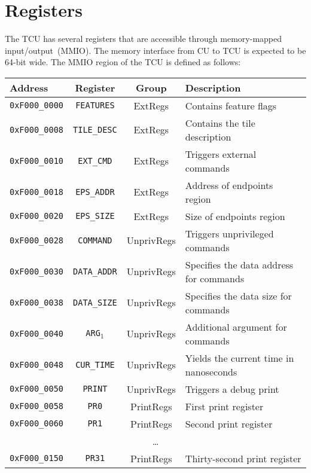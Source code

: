\section{Registers}

The TCU has several registers that are accessible through memory-mapped input/output~(MMIO). The
memory interface from CU to TCU is expected to be 64-bit wide. The MMIO region of the TCU is defined
as follows:

\vspace{2ex}
\noindent
\begin{tabular}{ p{3cm} | c | c | l }
  \textbf{Address} & \textbf{Register} & \textbf{Group} & \textbf{Description} \\
  \hline
  \hline
  \texttt{0xF000\_0000} & \texttt{FEATURES} & ExtRegs & Contains feature flags \\
  \texttt{0xF000\_0008} & \texttt{TILE\_DESC} & ExtRegs & Contains the tile description \\
  \texttt{0xF000\_0010} & \texttt{EXT\_CMD} & ExtRegs & Triggers external commands \\
  \texttt{0xF000\_0018} & \texttt{EPS\_ADDR} & ExtRegs & Address of endpoints region \\
  \texttt{0xF000\_0020} & \texttt{EPS\_SIZE} & ExtRegs & Size of endpoints region \\
  \hline
  \hline
  \texttt{0xF000\_0028} & \texttt{COMMAND} & UnprivRegs & Triggers unprivileged commands \\
  \texttt{0xF000\_0030} & \texttt{DATA\_ADDR} & UnprivRegs & Specifies the data address for commands \\
  \texttt{0xF000\_0038} & \texttt{DATA\_SIZE} & UnprivRegs & Specifies the data size for commands \\
  \texttt{0xF000\_0040} & \texttt{ARG$_1$} & UnprivRegs & Additional argument for commands \\
  \texttt{0xF000\_0048} & \texttt{CUR\_TIME} & UnprivRegs & Yields the current time in nanoseconds \\
  \texttt{0xF000\_0050} & \texttt{PRINT} & UnprivRegs & Triggers a debug print \\
  \hline
  \hline
  \texttt{0xF000\_0058} & \texttt{PR0} & PrintRegs & First print register \\
  \texttt{0xF000\_0060} & \texttt{PR1} & PrintRegs & Second print register \\
  \multicolumn{4}{c}{\dots} \\
  \texttt{0xF000\_0150} & \texttt{PR31} & PrintRegs & Thirty-second print register \\

\end{tabular}
